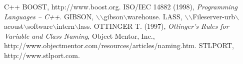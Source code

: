 \documentclass[10pt,a4paper,titlepage,dutch]{report}
\begin{document}
%
%

\begin{thebibliography}{99}

 C++ BOOST, http://www.boost.org.
 ISO/IEC 14882 (1998), {\it Programming Languages --
C++}.
 GIBSON,
$\backslash$$\backslash$gibson$\backslash$warehouse.
 LASS,
$\backslash$$\backslash$Fileserver-urb$\backslash$acoust$\backslash$software$\backslash$intern$\backslash$lass.
 OTTINGER T. (1997), {\it Ottinger's Rules for Variable
and Class Naming}, Object Mentor, Inc.,
http://www.objectmentor.com/resources/articles/naming.htm.
 STLPORT, http://www.stlport.com.

\end{thebibliography}
\end{document}
